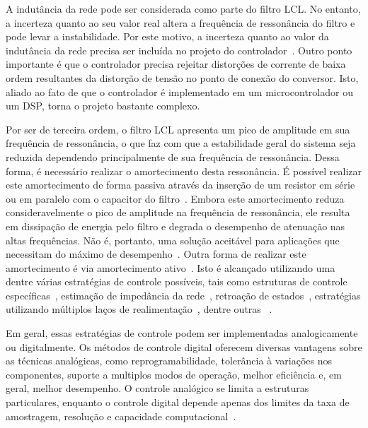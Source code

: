 	A indutância da rede pode ser considerada como parte do filtro LCL. No entanto, a incerteza quanto ao seu valor real altera a frequência de ressonância do filtro e pode levar a instabilidade. Por este motivo, a incerteza quanto ao valor da indutância da rede precisa ser incluída no projeto do controlador~\cite{ref:LISERRE}. Outro ponto importante é que o controlador precisa rejeitar distorções de corrente de baixa ordem resultantes da distorção de tensão no ponto de conexão do conversor. Isto, aliado ao fato de que o controlador é implementado em um microcontrolador ou um DSP, torna o projeto bastante complexo.

	Por ser de terceira ordem, o filtro LCL apresenta um pico de amplitude em sua frequência de ressonância, o que faz com que a estabilidade geral do sistema seja reduzida dependendo principalmente de sua frequência de ressonância. Dessa forma, é necessário realizar o amortecimento desta ressonância. É possível realizar este amortecimento de forma passiva através da inserção de um resistor em série ou em paralelo com o capacitor do filtro~\cite{ref:AHMED}. Embora este amortecimento reduza consideravelmente o pico de amplitude na frequência de ressonância, ele resulta em dissipação de energia pelo filtro e degrada o desempenho de atenuação nas altas frequências. Não é, portanto, uma solução aceitável para aplicações que necessitam do máximo de desempenho~\cite{ref:SHEN}. Outra forma de realizar este amortecimento é via amortecimento ativo~\cite{ref:GERVASIO}. Isto é alcançado utilizando uma dentre várias estratégias de controle possíveis, tais como estruturas de controle específicas~\cite{ref:WU}, estimação de impedância da rede~\cite{ref:BLAABJERG}, retroação de estados~\cite{ref:MASSING}, estratégias utilizando múltiplos laços de realimentação~\cite{ref:POH}, dentre outras~\cite{ref:WESSELS} \cite{ref:MORENO} \cite{ref:YANG}.

	Em geral, essas estratégias de controle podem ser implementadas analogicamente ou digitalmente. Os métodos de controle digital oferecem diversas vantagens sobre as técnicas analógicas, como reprogramabilidade, tolerância à variações nos componentes, suporte a multiplos modos de operação, melhor eficiência e, em geral, melhor desempenho. O controle analógico se limita a estruturas particulares, enquanto o controle digital depende apenas dos limites da taxa de amostragem, resolução e capacidade computacional~\cite{ref:KIMBALL}.

